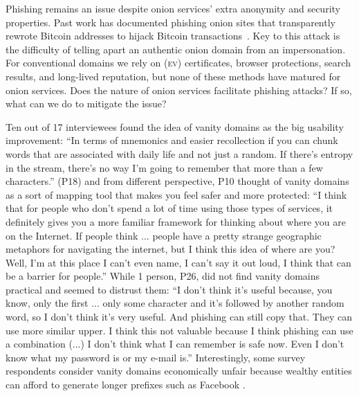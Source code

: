 Phishing remains an issue despite onion services' extra anonymity and security
properties.  Past work has documented phishing onion sites that transparently
rewrote Bitcoin addresses to hijack Bitcoin
transactions~\cite{Winter2016a,Nurmi2015a,Monteiro2016a}.  Key to this attack is
the difficulty of telling apart an authentic onion domain from an impersonation.
For conventional domains we rely on (\textsc{ev}) certificates, browser
protections, search results, and long-lived reputation, but none of these
methods have matured for onion services.  Does the nature of onion services
facilitate phishing attacks?  If so, what can we do to mitigate the issue?


Ten out of 17 interviewees found the idea of vanity domains as the big usability improvement: ``In terms of mnemonics and easier recollection if you can chunk words that are associated with daily life and not just a random. If there's entropy in the stream, there's no way I'm going to remember that more than a few characters.'' (P18) and from different perspective, P10 thought of vanity domains as a sort of mapping tool that makes you feel safer and more protected: ``I think that for people who don't spend a lot of time using those types of services, it definitely gives you a more familiar framework for thinking about where you are on the Internet. If people think ... people have a pretty strange geographic metaphors for navigating the internet, but I think this idea of where are you? Well, I'm at this place I can't even name, I can't say it out loud, I think that can be a barrier for people.'' While 1 person, P26, did not find vanity domains practical and seemed to distrust them: ``I don't think it's useful because, you know, only the first ... only some character and it's followed by another random word, so I don't think it's very useful. And phishing can still copy that. They can use more similar upper. I think this not valuable because I think phishing can use a combination (...) I don't think what I can remember is safe now. Even I don't know what my password is or my e-mail is.'' Interestingly, some  survey
respondents consider vanity domains economically unfair because wealthy entities
can afford to generate longer prefixes such as Facebook .


